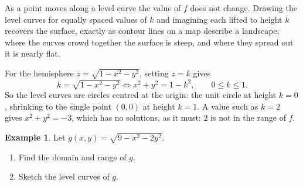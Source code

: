 \documentclass[11pt,a4paper]{article}
\theoremstyle{definition}
\newtheorem{exa}[thm]{Example}
\begin{document}
As a point moves along a level curve the value of $f$ does not change. Drawing
the level curves for equally spaced values of $k$ and imagining each lifted to
height $k$ recovers the surface, exactly as contour lines on a map describe a
landscape; where the curves crowd together the surface is steep, and where they
spread out it is nearly flat.

For the hemisphere $z = \sqrt{1 - x^2 - y^2}$, setting $z = k$ gives
\[k = \sqrt{1 - x^2 - y^2} \iff x^2 + y^2 = 1 - k^2 ,\qquad 0\leq k\leq 1 .\]
So the level curves are circles centred at the origin: the unit circle at
height $k = 0$, shrinking to the single point $(0,0)$ at height $k = 1$. A value
such as $k = 2$ gives $x^2 + y^2 = -3$, which has no solutions, as it must:
$2$ is not in the range of $f$.

\begin{figure}[H]
\centering
{}
\end{figure}

\begin{exa}
\label{ex:levelg}
Let $g(x,y) = \sqrt{9 - x^2 - 2y^2}$.
\begin{enumerate}
\item Find the domain and range of $g$.

\item Sketch the level curves of $g$.
\end{enumerate}
\end{exa}
\end{document}
